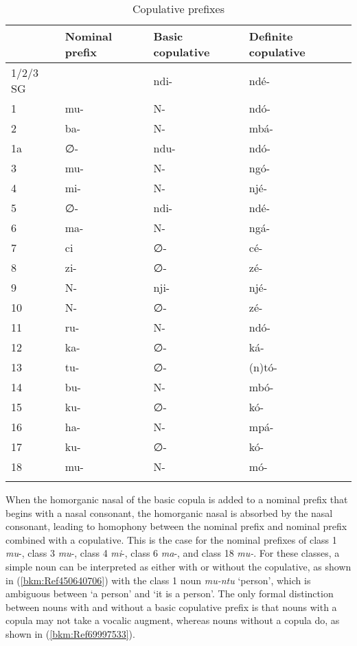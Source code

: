 \begin{table}
\label{bkm:Ref463366717}\caption{\label{tab:5:2}Copulative prefixes}

\begin{tabular}{llll}
\lsptoprule
& Nominal prefix & Basic copulative & Definite copulative\\
\midrule
1/2/3 SG &  & ndi- & ndé-\\
1 & mu- & N- & ndó-\\
2 & ba- & N- & mbá-\\
1a & ∅- & ndu- & ndó-\\
3 & mu- & N- & ngó-\\
4 & mi- & N- & njé-\\
5 & ∅- & ndi- & ndé-\\
6 & ma- & N- & ngá-\\
7 & ci & ∅- & cé-\\
8 & zi- & ∅- & zé-\\
9 & N- & nji- & njé-\\
10 & N- & ∅- & zé-\\
11 & ru- & N- & ndó-\\
12 & ka- & ∅- & ká-\\
13 & tu- & ∅- & (n)tó-\\
14 & bu- & N- & mbó-\\
15 & ku- & ∅- & kó-\\
16 & ha- & N- & mpá-\\
17 & ku- & ∅- & kó-\\
18 & mu- & N- & mó-\\
\lspbottomrule
\end{tabular}
\end{table}

When the homorganic nasal of the basic copula is added to a nominal prefix that begins with a nasal consonant, the homorganic nasal is absorbed by the nasal consonant, leading to homophony between the nominal prefix and nominal prefix combined with a copulative. This is the case for the nominal prefixes of class 1 \textit{mu}\nobreakdash-, class 3 \textit{mu}\nobreakdash-, class 4 \textit{mi}\nobreakdash-, class 6 \textit{ma}\nobreakdash-, and class 18 \textit{mu-}. For these classes, a simple noun can be interpreted as either with or without the copulative, as shown in (\ref{bkm:Ref450640706}) with the class 1 noun \textit{mu-ntu} ‘person’, which is ambiguous between ‘a person’ and ‘it is a person’. The only formal distinction between nouns with and without a basic copulative prefix is that nouns with a copula may not take a vocalic augment, whereas nouns without a copula do, as shown in (\ref{bkm:Ref69997533}).

